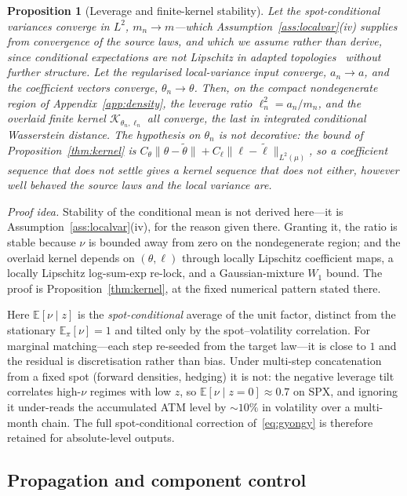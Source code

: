 \documentclass[11pt]{article}
\newtheorem{proposition}[theorem]{Proposition}
\newcommand{\E}{\mathbb{E}}
\newcommand{\cK}{\mathcal{K}}
\providecommand{\1}{\mathbf 1}
\begin{document}
\begin{proposition}[Leverage and finite-kernel stability]
\label{prop:stability}
Let the spot-conditional variances converge in $L^2$, $m_n\to m$---which
Assumption~\ref{ass:localvar}(iv) supplies from convergence of the source laws, and which we assume
rather than derive, since conditional expectations are not Lipschitz in adapted
topologies~\cite{beiglbockjmp2022} without further structure. Let the regularised local-variance
input converge, $a_n\to a$, and the coefficient vectors converge, $\theta_n\to\theta$. Then, on the
compact nondegenerate region of Appendix~\ref{app:density}, the leverage ratio $\ell_n^2=a_n/m_n$,
and the overlaid finite kernel $\cK_{\theta_n,\ell_n}$ all converge, the last in integrated
conditional Wasserstein distance. The hypothesis on $\theta_n$ is not decorative: the bound of
Proposition~\ref{thm:kernel} is $C_\theta\|\theta-\tilde\theta\|+C_\ell\|\ell-\tilde\ell\|_{L^2(\mu)}$,
so a coefficient sequence that does not settle gives a kernel sequence that does not either,
however well behaved the source laws and the local variance are.
\end{proposition}

\noindent \emph{Proof idea.} Stability of the conditional mean is not derived here---it is
Assumption~\ref{ass:localvar}(iv), for the reason given there. Granting it, the ratio is stable
because $\nu$ is bounded away from zero on the nondegenerate region; and the overlaid kernel depends on $(\theta,\ell)$ through locally Lipschitz
coefficient maps, a locally Lipschitz log-sum-exp re-lock, and a Gaussian-mixture $W_1$ bound. The
proof is Proposition~\ref{thm:kernel}, at the fixed numerical pattern stated there.

Here $\E[\nu\mid z]$ is the \emph{spot-conditional} average of the unit factor, distinct from the
stationary $\E_\pi[\nu]=1$ and tilted only by the spot--volatility correlation. For marginal
matching---each step re-seeded from the target law---it is close to $1$ and the residual is
discretisation rather than bias. Under multi-step concatenation from a fixed spot (forward
densities, hedging) it is not: the negative leverage tilt correlates high-$\nu$ regimes with low
$z$, so $\E[\nu\mid z{=}0]\approx0.7$ on SPX, and ignoring it under-reads the accumulated ATM level
by ${\sim}10\%$ in volatility over a multi-month chain. The full spot-conditional correction
of~\eqref{eq:gyongy} is therefore retained for absolute-level outputs.

\subsection{Propagation and component control}
\label{sec:recompress}\label{sec:interp}
\end{document}
